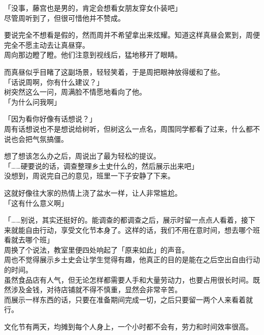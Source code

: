 「没事，藤宫也是男的，肯定会想看女朋友穿女仆装吧」\\

尽管周听到了，但很可惜他并不赞成。

要说完全不想看是假的，然而周并不希望拿出来炫耀。知道这样真昼会累到，周便完全不愿主动去让真昼穿。\\

周向那边瞪了瞪。他们注意到视线后，猛地移开了眼睛。

而真昼似乎目睹了这副场景，轻轻笑着，于是周把眼神放得缓和了些。\\

「话说周啊，你有什么建议？」\\

树突然这么一问，周满脸不情愿地看向了他。\\

「为什么问我啊」

「因为看你好像有话想说？」\\

周有话想说也不是想说给树听，但树这么一点名，周围同学都看了过来，什么都不说也会把气氛搞僵。

想了想该怎么办之后，周说出了最为轻松的提议。\\

「……硬要说的话，调查整理乡土史什么的，然后展示出来吧」\\

没想到，周说完自己的意见，班里一下子安静了下来。

这就好像往大家的热情上浇了盆水一样，让人非常尴尬。\\

「这有什么意义啊」

「……别说，其实还挺好的。能调查的都调查之后，展示时留一点点人看着，接下来就能自由行动，享受文化节本身了。这样的话，我们不用在意时间，想去哪个班看就去哪个班」\\

周换了个说法，教室里便四处响起了「原来如此」的声音。\\

周也不觉得展示乡土史会让学生觉得有趣，他真正的目的是能在之后空出自由行动的时间。\\

虽然食品店有人气，但无论怎样都需要人手和大量劳动力，也要占用很长时间。既然涉及金钱，对待店铺就不得不慎重，显然会非常辛苦。\\

而展示一样东西的话，只要在准备期间完成一切，之后只要留一两个人来看着就行。

文化节有两天，均摊到每个人身上，一个小时都不会有，劳力和时间效率很高。

